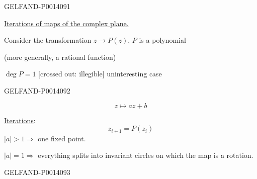 \begin{GelfandAdjacentEvidence}{GELFAND-P001409}{1}

\qquad \uline{Iterations of maps of the complex plane.}

Consider the transformation \(z\to P(z)\), \(P\) is a polynomial

(more generally, a rational function)

\(\deg P=1\) [crossed out: illegible] uninteresting case
\end{GelfandAdjacentEvidence}
\begin{GelfandAdjacentEvidence}{GELFAND-P001409}{2}


\begin{equation*}
z\mapsto az+b \tag{1}
\end{equation*}

\uline{Iterations}:
\[
z_{i+1}=P(z_i)
\]
\(\lvert a\rvert>1\Rightarrow\) one fixed point.

\(\lvert a\rvert=1\Rightarrow\) everything splits into invariant circles on which the map is a rotation.
\end{GelfandAdjacentEvidence}
\begin{GelfandAdjacentEvidence}{GELFAND-P001409}{3}


\end{GelfandAdjacentEvidence}
